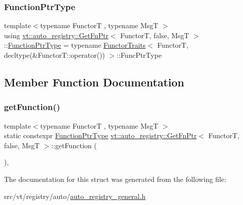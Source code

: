 \subsubsection{\texorpdfstring{Function\+Ptr\+Type}{FunctionPtrType}}
{\footnotesize\ttfamily template$<$typename FunctorT , typename MsgT $>$ \\
using \hyperlink{structvt_1_1auto__registry_1_1_get_fn_ptr}{vt\+::auto\+\_\+registry\+::\+Get\+Fn\+Ptr}$<$ FunctorT, false, MsgT $>$\+::\hyperlink{structvt_1_1auto__registry_1_1_get_fn_ptr_3_01_functor_t_00_01false_00_01_msg_t_01_4_ae7611c944f926e6b7a882629dbda4efb}{Function\+Ptr\+Type} =  typename \hyperlink{structvt_1_1_functor_traits}{Functor\+Traits}$<$ FunctorT, decltype(\&Functor\+T\+::operator()) $>$\+::Func\+Ptr\+Type}



\subsection{Member Function Documentation}
\mbox{\label{structvt_1_1auto__registry_1_1_get_fn_ptr_3_01_functor_t_00_01false_00_01_msg_t_01_4_a10f8dab2cc954636dcb4fa81ba70264d}} 
\subsubsection{\texorpdfstring{get\+Function()}{getFunction()}}
{\footnotesize\ttfamily template$<$typename FunctorT , typename MsgT $>$ \\
static constexpr \hyperlink{structvt_1_1auto__registry_1_1_get_fn_ptr_3_01_functor_t_00_01false_00_01_msg_t_01_4_ae7611c944f926e6b7a882629dbda4efb}{Function\+Ptr\+Type} \hyperlink{structvt_1_1auto__registry_1_1_get_fn_ptr}{vt\+::auto\+\_\+registry\+::\+Get\+Fn\+Ptr}$<$ FunctorT, false, MsgT $>$\+::get\+Function (\begin{DoxyParamCaption}{ }\end{DoxyParamCaption})\hspace{0.3cm}{\ttfamily [inline]}, {\ttfamily [static]}}



The documentation for this struct was generated from the following file\+:\begin{DoxyCompactItemize}
\item 
src/vt/registry/auto/\hyperlink{auto__registry__general_8h}{auto\+\_\+registry\+\_\+general.\+h}\end{DoxyCompactItemize}
